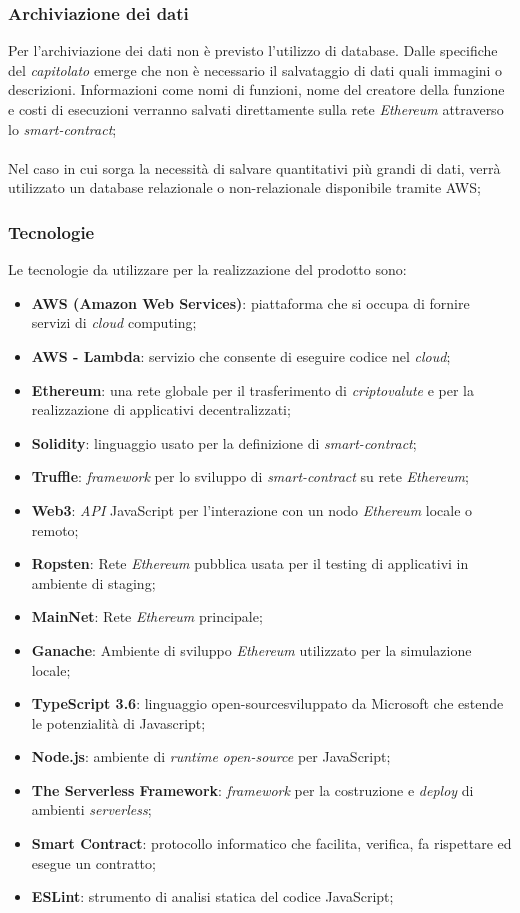 \subsubsection{Archiviazione dei dati}
Per l'archiviazione dei dati non è previsto l'utilizzo di database. Dalle specifiche del \textit{capitolato\glo} emerge che non è necessario il salvataggio di dati quali immagini o descrizioni. Informazioni come nomi di funzioni, nome del creatore della funzione e costi di esecuzioni verranno salvati direttamente sulla rete \textit{Ethereum\glo} attraverso lo  \textit{smart-contract\glos}; 
\\\\
Nel caso in cui sorga la necessità di salvare quantitativi più grandi di dati, verrà utilizzato un database relazionale o non-relazionale disponibile tramite AWS;

\subsubsection{Tecnologie}
Le tecnologie da utilizzare per la realizzazione del prodotto sono:
\begin{itemize}
	\item \textbf{AWS (Amazon Web Services)}: piattaforma che si occupa di fornire servizi di \textit{cloud\glo} computing;
	\item \textbf{AWS - Lambda}: servizio che consente di eseguire codice nel \textit{cloud\glos};
	\item \textbf{Ethereum}: una rete globale per il trasferimento di \textit{criptovalute\glo} e per la realizzazione di applicativi decentralizzati;
	\item \textbf{Solidity}: linguaggio usato per la definizione di \textit{smart-contract\glos};
	\item \textbf{Truffle}: \textit{framework\glo} per lo sviluppo di \textit{smart-contract\glo} su rete \textit{Ethereum\glos};
	\item \textbf{Web3}: \textit{API\glo} JavaScript per l'interazione con un nodo \textit{Ethereum\glo} locale o remoto;
	\item \textbf{Ropsten}: Rete \textit{Ethereum\glo} pubblica usata per il testing di applicativi in ambiente di staging;
	\item \textbf{MainNet}: Rete \textit{Ethereum\glo} principale;
	\item \textbf{Ganache}: Ambiente di sviluppo \textit{Ethereum\glo} utilizzato per la simulazione locale;
	\item \textbf{TypeScript 3.6}:  linguaggio open-source\glo sviluppato da Microsoft che estende le potenzialità di Javascript;
	\item \textbf{Node.js}: ambiente di \textit{runtime\glo} \textit{open-source\glo} per JavaScript;
	\item \textbf{The Serverless Framework}: \textit{framework\glo} per la costruzione e \textit{deploy\glo}  di ambienti \textit{serverless\glos};
	\item \textbf{Smart Contract}: protocollo informatico che facilita, verifica, fa rispettare ed esegue un contratto;
	\item \textbf{ESLint}: strumento di analisi statica del codice JavaScript;
\end{itemize}
